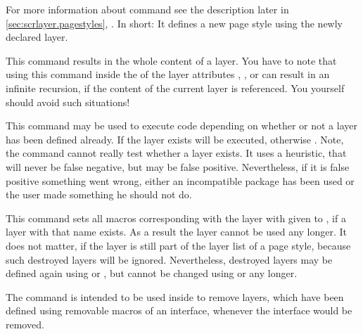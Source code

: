 For more information about command
 see
the description later in \autoref{sec:scrlayer.pagestyles},
. In short: It
defines a new page style using the newly declared layer.%
\EndIndexGroup


\begin{Declaration}
\end{Declaration}
This command results in the whole content
of a layer. You have to note that using this
command inside the  of the layer attributes ,
, or  can result in
an infinite recursion, if the content of the current layer is referenced. You
yourself should avoid such situations!%
\EndIndexGroup


\begin{Declaration}
\end{Declaration}
This command may be used to execute code depending on whether or not a layer
has been defined already. If the layer exists  will be
executed, otherwise . Note, the command cannot really
test whether a layer exists. It uses a heuristic, that will never be false
negative, but may be false positive. Nevertheless, if it is false positive
something went wrong, either an incompatible package has been used or the user
made something he should not do.%
\EndIndexGroup


\begin{Declaration}
\end{Declaration}
This command sets all macros corresponding with the layer with given
 to , if a layer with that name exists. As a
result the layer cannot be used any longer. It does not matter, if the layer
is still part of the layer list of a page style, because such destroyed layers
will be ignored. Nevertheless, destroyed layers may be defined again using
 or
, but cannot be changed using
 or
 any longer.

The command is intended to be used inside
 to remove layers, which have been
defined using removable macros of an interface, whenever the interface would
be removed.%
\EndIndexGroup


